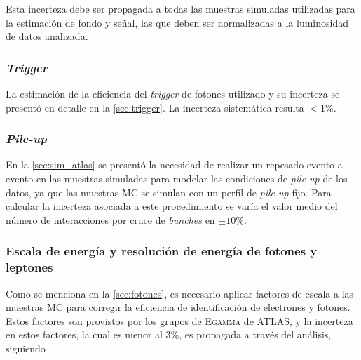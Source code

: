 Esta incerteza debe ser propagada a todas las muestras simuladas utilizadas
para la estimación de fondo y señal, las que deben ser normalizadas a la
luminosidad de datos analizada.


\subsubsection{\emph{Trigger}}

La estimación de la eficiencia del \emph{trigger} de fotones utilizado y su incerteza se presentó
en detalle en la \cref{sec:trigger}. La incerteza sistemática resulta $< 1\%$. %



\subsubsection{\emph{Pile-up}}

En la \cref{sec:sim_atlas} se presentó la necesidad de realizar un repesado
evento a evento en las muestras simuladas para modelar las condiciones de
\emph{pile-up} de los datos, ya que las muestras MC se simulan con un perfil de
\emph{pile-up} fijo. Para calcular la incerteza asociada a este procedimiento se
varía el valor medio del número de interacciones por cruce de \emph{bunches} en
$\pm 10\%$.



\subsubsection{Escala de energía y resolución de energía de fotones y leptones}

Como se menciona en la \cref{sec:fotones}, es necesario aplicar factores de
escala a las muestras MC para corregir la eficiencia de  identificación
de electrones y fotones. Estos factores son provistos por los grupos
de \textsc{Egamma} de ATLAS, y la incerteza en estos factores, la cual es menor al 3\%, es propagada
a través del análisis, siguiendo \cite{PhoEffTwiki,EleEffTwiki,EGScaleTwiki,MCPTwiki}.

